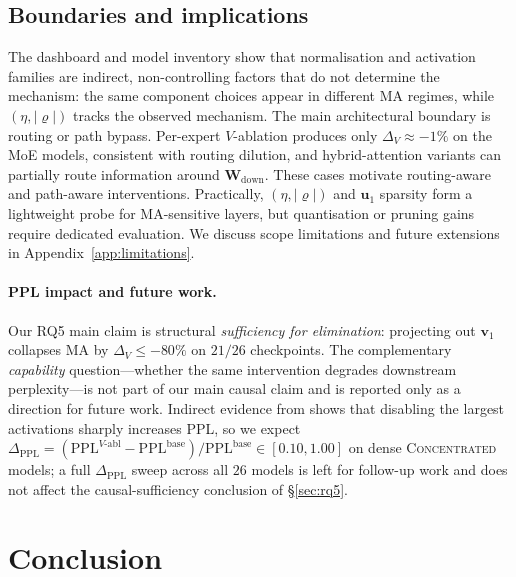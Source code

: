 \documentclass{article}
\newcommand{\Wdown}{\mathbf{W}_{\text{down}}}
\begin{document}
\subsection{Boundaries and implications}
\label{sec:moe-dilution}

The dashboard and model inventory show that normalisation and activation
families are indirect, non-controlling factors that do not determine
the mechanism: the same component choices appear in different MA
regimes, while $(\eta,|\varrho|)$ tracks the observed mechanism. The main architectural boundary is routing or path bypass.
Per-expert $V$-ablation produces only $\Delta_V \approx -1\%$ on the MoE
models, consistent with routing dilution, and hybrid-attention variants can
partially route information around $\Wdown$. These cases motivate
routing-aware and path-aware interventions. Practically, $(\eta,|\varrho|)$
and $\mathbf{u}_1$ sparsity form a lightweight probe for MA-sensitive layers,
but quantisation or pruning gains require dedicated evaluation. We discuss
scope limitations and future extensions in Appendix~\ref{app:limitations}.

\paragraph{PPL impact and future work.}
\label{sec:ppl-future-work}
Our RQ5 main claim is structural \emph{sufficiency for elimination}:
projecting out $\mathbf{v}_1$ collapses MA by $\Delta_V \leq -80\%$ on
$21/26$ checkpoints. The complementary \emph{capability} question---whether
the same intervention degrades downstream perplexity---is not part of
our main causal claim and is reported only as a direction for future
work. Indirect evidence from \citet{sun2024massive} shows that
disabling the largest activations sharply increases PPL, so we expect
$\Delta_{\text{PPL}} = (\text{PPL}^{V\text{-abl}} - \text{PPL}^{\text{base}})/\text{PPL}^{\text{base}} \in [0.10, 1.00]$
on dense \textsc{Concentrated} models; a full $\Delta_{\text{PPL}}$
sweep across all $26$ models is left for follow-up work and does not
affect the causal-sufficiency conclusion of \S\ref{sec:rq5}.

\section{Conclusion}
\label{sec:conclusion}
\end{document}
